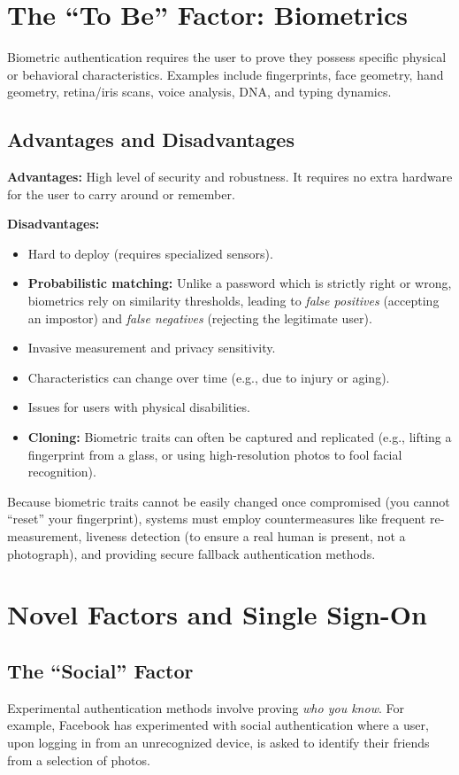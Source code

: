 \section{The ``To Be'' Factor: Biometrics}
Biometric authentication requires the user to prove they possess specific physical or behavioral characteristics. Examples include fingerprints, face geometry, hand geometry, retina/iris scans, voice analysis, DNA, and typing dynamics.

\subsection{Advantages and Disadvantages}
\textbf{Advantages:} High level of security and robustness. It requires no extra hardware for the user to carry around or remember.

\textbf{Disadvantages:} 
\begin{itemize}
    \item Hard to deploy (requires specialized sensors).
    \item \textbf{Probabilistic matching:} Unlike a password which is strictly right or wrong, biometrics rely on similarity thresholds, leading to \textit{false positives} (accepting an impostor) and \textit{false negatives} (rejecting the legitimate user).
    \item Invasive measurement and privacy sensitivity.
    \item Characteristics can change over time (e.g., due to injury or aging).
    \item Issues for users with physical disabilities.
    \item \textbf{Cloning:} Biometric traits can often be captured and replicated (e.g., lifting a fingerprint from a glass, or using high-resolution photos to fool facial recognition).
\end{itemize}

Because biometric traits cannot be easily changed once compromised (you cannot ``reset'' your fingerprint), systems must employ countermeasures like frequent re-measurement, liveness detection (to ensure a real human is present, not a photograph), and providing secure fallback authentication methods.

\section{Novel Factors and Single Sign-On}

\subsection{The ``Social'' Factor}
Experimental authentication methods involve proving \textit{who you know}. For example, Facebook has experimented with social authentication where a user, upon logging in from an unrecognized device, is asked to identify their friends from a selection of photos.

